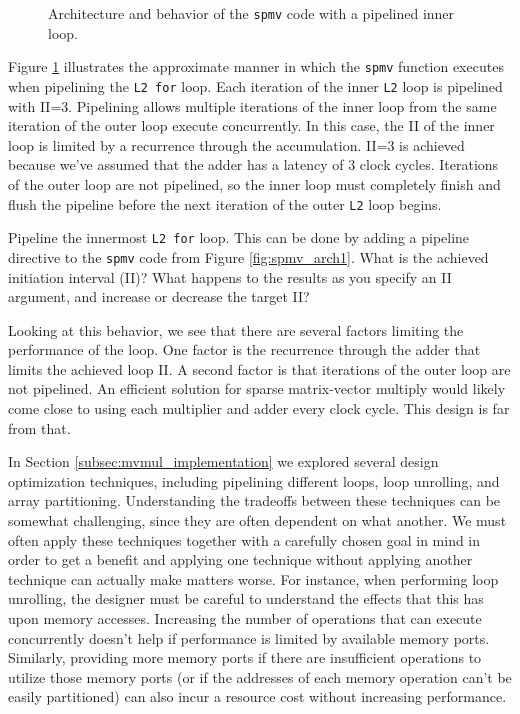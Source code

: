 \begin{figure}
\centering

\caption{Architecture and behavior of the \lstinline{spmv} code with a pipelined inner loop.}
\label{fig:spmv_pipeline_inner}
\end{figure}

Figure \ref{fig:spmv_pipeline_inner} illustrates the approximate manner in which the \lstinline{spmv} function executes when pipelining the \lstinline{L2 for} loop. Each iteration of the inner \lstinline{L2} loop is pipelined with II=3.  Pipelining allows multiple iterations of the inner loop from the same iteration of the outer loop execute concurrently.  In this case, the II of the inner loop is limited by a recurrence through the accumulation.  II=3 is achieved because we've assumed that the adder has a latency of 3 clock cycles.  Iterations of the outer loop are not pipelined, so the inner loop must completely finish and flush the pipeline before the next iteration of the outer \lstinline{L2} loop begins.

\begin{exercise}
Pipeline the innermost \lstinline{L2 for} loop. This can be done by adding a pipeline directive to the \lstinline{spmv} code from Figure \ref{fig:spmv_arch1}. What is the achieved initiation interval (II)? What happens to the results as you specify an II argument, and increase or decrease the target II? 
\end{exercise}

Looking at this behavior, we see that there are several factors limiting the performance of the loop.  One factor is the recurrence through the adder that limits the achieved loop II.  A second factor is that iterations of the outer loop are not pipelined.  An efficient solution for sparse matrix-vector multiply would likely come close to using each multiplier and adder every clock cycle.  This design is far from that.

In Section \ref{subsec:mvmul_implementation} we explored several design optimization techniques, including pipelining different loops, loop unrolling, and array partitioning.  Understanding the tradeoffs between these techniques can be somewhat challenging, since they are often dependent on what another.  We must often apply these techniques together with a carefully chosen goal in mind in order to get a benefit and applying one technique without applying another technique can actually make matters worse.  For instance, when performing loop unrolling, the designer must be careful to understand the effects that this has upon memory accesses. Increasing the number of operations that can execute concurrently doesn't help if performance is limited by available memory ports.  Similarly, providing more memory ports if there are insufficient operations to utilize those memory ports (or if the addresses of each memory operation can't be easily partitioned) can also incur a resource cost without increasing performance.   

